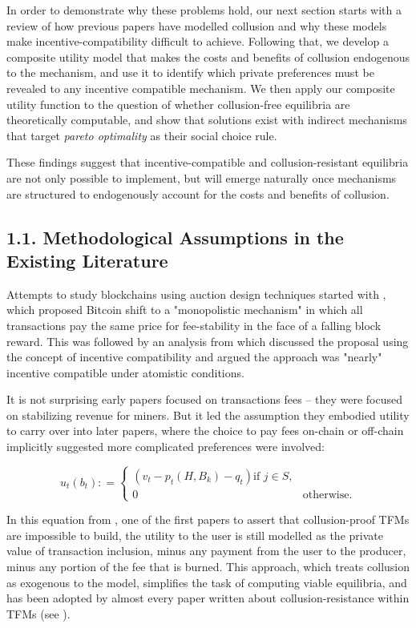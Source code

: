 \documentclass[oneside]{article}   	%
\begin{document}
In order to demonstrate why these problems hold, our next section starts with a review of how previous papers have modelled collusion and why these models make incentive-compatibility difficult to achieve. Following that, we develop a composite utility model that makes the costs and benefits of collusion endogenous to the mechanism, and use it to identify which private preferences must be revealed to any incentive compatible mechanism. We then apply our composite utility function to the question of whether collusion-free equilibria are theoretically computable, and show that solutions exist with indirect mechanisms that target \textit{pareto optimality} as their social choice rule.

These findings suggest that incentive-compatible and collusion-resistant equilibria are not only possible to implement, but will emerge naturally once mechanisms are structured to endogenously account for the costs and benefits of collusion.


\subsection*{1.1. Methodological Assumptions in the Existing Literature}

Attempts to study blockchains using auction design techniques started with \cite{Lavi2017RedesigningBitcoin}, which proposed Bitcoin shift to a "monopolistic mechanism" in which all transactions pay the same price for fee-stability in the face of a falling block reward. This was followed by an analysis from \cite{Yao2018IncentiveBitcoin} which discussed the proposal using the concept of incentive compatibility and argued the approach was "nearly" incentive compatible under atomistic conditions.

It is not surprising early papers focused on transactions fees -- they were focused on stabilizing revenue for miners. But it led the assumption they embodied utility to carry over into later papers, where the choice to pay fees on-chain or off-chain implicitly suggested more complicated preferences were involved:

\[
u_t\left(b_t\right) : =
\begin{cases}
\left(
        v_t - p_t\left(H,B_k\right) - q_t
\right) \text{if } j \in S, \\ 0 & \text{otherwise.}
\end{cases}
\]

In this equation from \cite{roughgarden2024}, one of the first papers to assert that collusion-proof TFMs are impossible to build, the utility to the user is still modelled as the private value of transaction inclusion, minus any payment from the user to the producer, minus any portion of the fee that is burned. This approach, which treats collusion as exogenous to the model, simplifies the task of computing viable equilibria, and has been adopted by almost every paper written about collusion-resistance within TFMs (see \cite{chen2022bayesian, ferreira2021dynamic, wu2023maximizing, damle2024designing, gafni2024barriers, bahrani2023transaction, bahrani2024transaction, chung2024collusion, chung2023foundations}).
\end{document}
